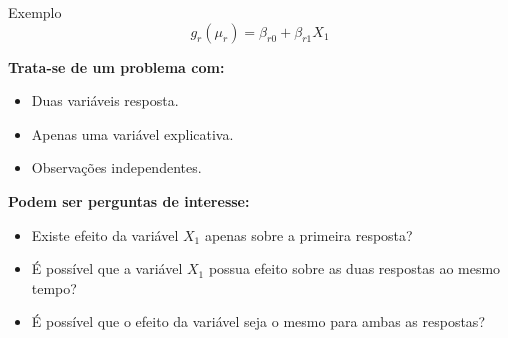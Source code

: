 \documentclass[
  ignorenonframetext,
  serif,
  professionalfont,
  usenames,
  dvipsnames,
  aspectratio = 169]{beamer}
\def\endColumns{\end{minipage}}%
\def\beginAHalfColumnT{\begin{minipage}[t]{0.49\textwidth}}%
\begin{document}
\begin{frame}{Exemplo}
\protect\hypertarget{exemplo-1}{}
\[
g_r(\mu_r) = \beta_{r0} + \beta_{r1} X_1
\]

\beginAHalfColumnT

\textbf{Trata-se de um problema com:}

\begin{itemize}
  \itemsep 1ex
  \item Duas variáveis resposta.
  \item Apenas uma variável explicativa.
  \item Observações independentes.
\end{itemize}

\endColumns
\beginAHalfColumnT

\textbf{Podem ser perguntas de interesse:}

\begin{itemize}
  \itemsep 1ex
  \item Existe efeito da variável $X_1$ apenas sobre a primeira resposta?
  \item É possível que a variável $X_1$ possua efeito sobre as duas respostas ao mesmo tempo?
  \item É possível que o efeito da variável seja o mesmo para ambas as respostas? 
\end{itemize}

\endColumns
\end{frame}
\end{document}

